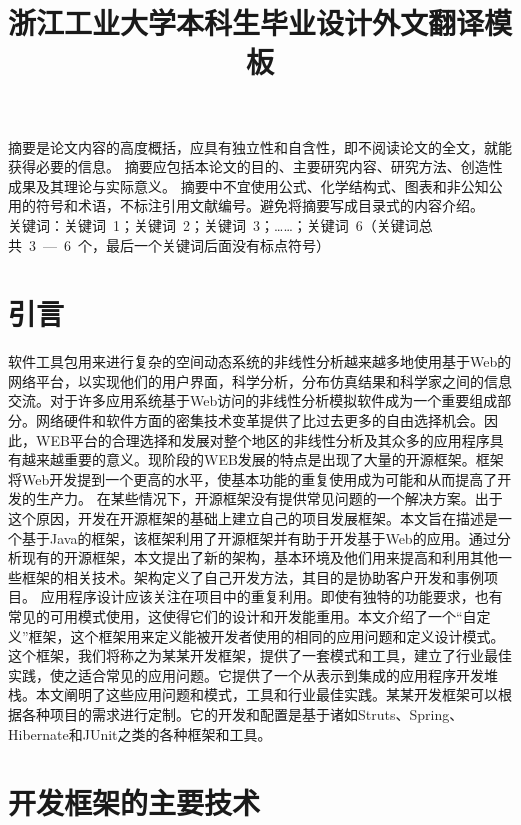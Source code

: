 
\title{浙江工业大学本科生毕业设计外文翻译模板}
\date{}
\maketitle

摘要是论文内容的高度概括，应具有独立性和自含性，即不阅读论文的全文，就能获得必要的信息。
摘要应包括本论文的目的、主要研究内容、研究方法、创造性成果及其理论与实际意义。
摘要中不宜使用公式、化学结构式、图表和非公知公用的符号和术语，不标注引用文献编号。避免将摘要写成目录式的内容介绍。\\
{\hei 关键词：}\quad 关键词~1；关键词~2；关键词~3；……；关键词~6（关键词总共~3~—~6~个，最后一个关键词后面没有标点符号）

\section{引言}
软件工具包用来进行复杂的空间动态系统的非线性分析越来越多地使用基于Web的网络平台，以实现他们的用户界面，科学分析，分布仿真结果和科学家之间的信息交流。对于许多应用系统基于Web访问的非线性分析模拟软件成为一个重要组成部分。网络硬件和软件方面的密集技术变革提供了比过去更多的自由选择机会。因此，WEB平台的合理选择和发展对整个地区的非线性分析及其众多的应用程序具有越来越重要的意义。现阶段的WEB发展的特点是出现了大量的开源框架。框架将Web开发提到一个更高的水平，使基本功能的重复使用成为可能和从而提高了开发的生产力。
在某些情况下，开源框架没有提供常见问题的一个解决方案。出于这个原因，开发在开源框架的基础上建立自己的项目发展框架。本文旨在描述是一个基于Java的框架，该框架利用了开源框架并有助于开发基于Web的应用。通过分析现有的开源框架，本文提出了新的架构，基本环境及他们用来提高和利用其他一些框架的相关技术。架构定义了自己开发方法，其目的是协助客户开发和事例项目。
应用程序设计应该关注在项目中的重复利用。即使有独特的功能要求，也有常见的可用模式使用，这使得它们的设计和开发能重用。本文介绍了一个“自定义”框架，这个框架用来定义能被开发者使用的相同的应用问题和定义设计模式。这个框架，我们将称之为某某开发框架，提供了一套模式和工具，建立了行业最佳实践，使之适合常见的应用问题。它提供了一个从表示到集成的应用程序开发堆栈。本文阐明了这些应用问题和模式，工具和行业最佳实践。某某开发框架可以根据各种项目的需求进行定制。它的开发和配置是基于诸如Struts、Spring、Hibernate和JUnit之类的各种框架和工具。
\section{开发框架的主要技术}
